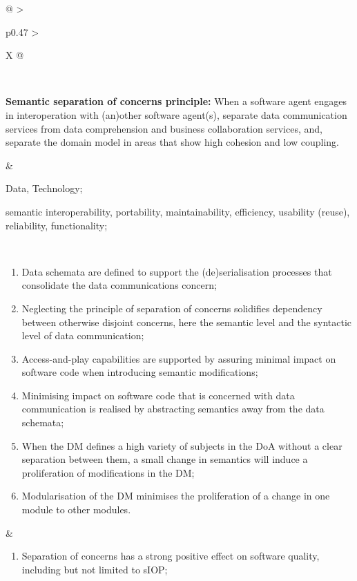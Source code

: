 \begin{xltabular}[l]{\linewidth}{@{} >{\small\raggedright\arraybackslash}p{0.47\linewidth} >{\small\raggedright\arraybackslash}X @{}}
\begin{enumerate}[left=10pt, nosep]
\end{enumerate} \\
%
%
%
\begin{mmdp}\label{dp:ssoc}{\bfseries Semantic separation of concerns principle:}
\quad When a software agent engages in interoperation with (an)other software agent(s), separate data communication services from data comprehension and business collaboration services, and, separate the domain model in areas that show high cohesion and low coupling. \end{mmdp}
&
\begin{description}[labelwidth=3.7cm,leftmargin=3.7cm+1ex,nosep,topsep=2ex,labelsep=1ex,font=\bfseries]
\item[Type of information:] Data, Technology;
\item[Quality attributes:] semantic interoperability, portability, maintainability, efficiency, usability (reuse), reliability, functionality;
\end{description}
\\
\begin{enumerate}[left=6pt, nosep]
  \item Data schemata are defined to support the (de)serialisation processes that consolidate the data communications concern;
  \item Neglecting the principle of separation of concerns solidifies dependency between otherwise disjoint concerns, here the semantic level and the syntactic level of data communication;
  \item Access-and-play capabilities are supported by assuring minimal impact on software code when introducing semantic modifications;
  \item Minimising impact on software code that is concerned with data communication is realised by abstracting semantics away from the data schemata;
  \item When the DM defines a high variety of subjects in the DoA without a clear separation between them, a small change in semantics will induce a proliferation of modifications in the DM;
  \item Modularisation of the DM minimises the proliferation of a change in one module to other modules.
\end{enumerate}
&
\begin{enumerate}[left=10pt, nosep]
  \item Separation of concerns has a strong positive effect on software quality, including but not limited to sIOP;

\end{enumerate}
\end{xltabular}
